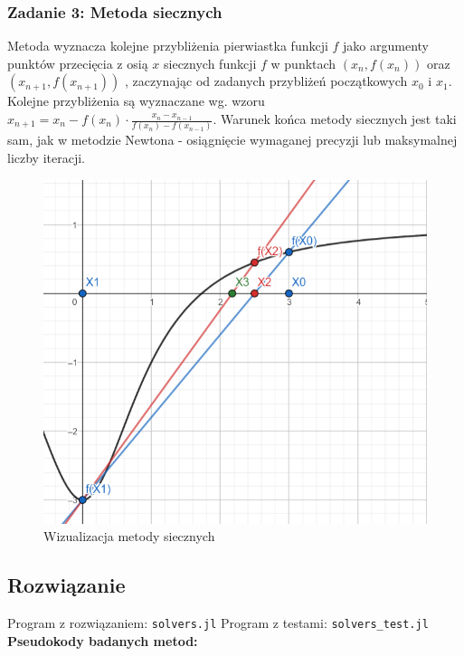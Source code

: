 \documentclass[11pt]{article}
\begin{document}
        \subsubsection*{Zadanie 3: Metoda siecznych}
            Metoda wyznacza kolejne przybliżenia pierwiastka funkcji $f$ jako argumenty punktów przecięcia z osią $x$ 
            siecznych funkcji $f$ w punktach $(x_n, f(x_n))$ oraz $(x_{n + 1}, f(x_{n + 1}))$ , zaczynając od zadanych
            przybliżeń początkowych $x_0$ i $x_1$. Kolejne przybliżenia są wyznaczane wg. wzoru
            $x_{n + 1} = x_n - f(x_n) \cdot \frac{x_n - x_{n - 1}}{f(x_n) - f(x_{n - 1})}$.
            Warunek końca metody siecznych jest taki sam, jak w metodzie Newtona - osiągnięcie wymaganej precyzji lub
            maksymalnej liczby iteracji.
            \newline
            \begin{figure}[h]
                \centering
                \includegraphics[scale=0.6]{img/secant.png}
                \caption{Wizualizacja metody siecznych}
                \label{fig:secant}
            \end{figure}

    \newpage
        
    \subsection*{Rozwiązanie}
        Program z rozwiązaniem: \texttt{solvers.jl}
        \newline
        Program z testami: \texttt{solvers\_test.jl}
        \newline\newline
        \textbf{Pseudokody badanych metod:}
\end{document}
